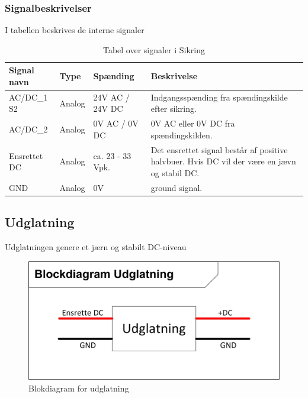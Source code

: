 \subsubsection{Signalbeskrivelser}
I tabellen beskrives de interne signaler
\begin{table}[H]
\begin{tabular}{|p{3cm}|p{3cm}|p{3cm}|p{4.5cm}|} \hline
\cellcolor[gray]{0.85}Signal navn& \cellcolor[gray]{0.85}Type &\cellcolor[gray]{0.85}Spænding&\cellcolor[gray]{0.85}Beskrivelse\\ \hline
AC/DC\_1 S2 & Analog  & 24V AC / 24V DC & Indgangsspænding fra spændingskilde efter sikring.\\  \hline
AC/DC\_2  & Analog & 0V AC / 0V DC & 0V AC eller 0V DC fra spændingskilden. \\  \hline
Ensrettet DC & Analog & ca. 23 - 33 Vpk. & Det ensrettet signal består af positive halvbuer. Hvis DC vil der være en jævn og stabil DC.\\ \hline
GND & Analog & 0V & ground signal.\\ \hline
\end{tabular}
\caption{Tabel over signaler i Sikring}
\label{table:Ensretter}
\end{table}
\newpage
\subsection{Udglatning}
Udglatningen genere et jærn og stabilt DC-niveau
\begin{figure}[H]
\centering
\includegraphics[scale=1]{billeder/UdglatningsBlok}
\caption{Blokdiagram for udglatning}
\label{fig:UdglatningBlok}
\end{figure}
